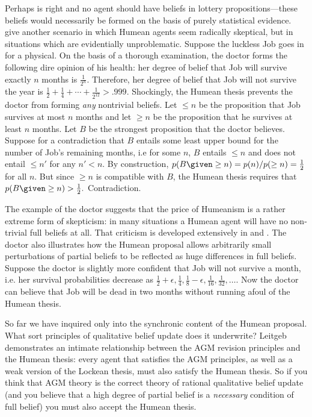 Perhaps \citet{buchak2014belief} is right and no agent should have beliefs in
lottery propositions---these beliefs would necessarily be formed on the basis of
purely statistical evidence. \citet{lin2019correspondence} give another scenario
in which Humean agents seem radically skeptical, but in situations which are
evidentially unproblematic. Suppose the luckless Job goes in for a physical. On
the basis of a thorough examination, the doctor forms the following dire opinion
of his health: her degree of belief that Job will survive exactly $n$ months is
$\frac{1}{2^n}.$ Therefore, her degree of belief that Job will not survive the
year is $\frac{1}{2} + \frac{1}{4} + \cdots + \frac{1}{2^{12}} > .999.$
Shockingly, the Humean thesis prevents the doctor from forming {\em any}
nontrivial beliefs. Let $\leq n$ be the proposition that Job survives at most
$n$ months and let $\geq n$ be the proposition that he survives at least $n$
months. Let $B$ be the strongest proposition that the doctor believes. Suppose
for a contradiction that $B$ entails some least upper bound for the number of
Job's remaining months, i.e for some $n$, $B$ entails $\leq n$ and does not
entail $\leq n'$ for any $n'<n$.  By construction, $p(B \given \geq n) =
p(n)/p(\geq n) = \frac{1}{2}$ for all $n$. But since $\geq n$ is compatible with
$B$, the Humean thesis requires that $p(B \given  \geq n) > \frac{1}{2}.$
Contradiction. 

The example of the doctor suggests that the price of Humeanism is a rather
extreme form of skepticism: in many situations a Humean agent will have no
non-trivial full beliefs at all. That criticism is developed extensively in
\citet{rott2017stability} and \citet{douven2018probabilities}. The doctor also
illustrates how the Humean proposal allows arbitrarily small perturbations of
partial beliefs to be reflected as huge differences in full beliefs. Suppose the
doctor is slightly more confident that Job will not survive a month, i.e. her
survival probabilities decrease as $\frac{1}{2} + \epsilon, \frac{1}{4},
\frac{1}{8} - \epsilon, \frac{1}{16}, \frac{1}{32}, \ldots.$ Now the doctor can
believe that Job will be dead in two months without running afoul of the Humean
thesis.

So far we have inquired  only into the synchronic content of the Humean
proposal. What sort principles of qualitative belief update does it underwrite?
Leitgeb demonstrates an intimate relationship between the AGM revision principles
and the Humean thesis: every agent that satisfies the AGM principles, as well as
a weak version of the Lockean thesis, must also satisfy the Humean thesis. So if
you think that AGM theory is the correct theory of rational qualitative belief
update (and you believe that a high degree of partial belief is a {\em
necessary} condition of full belief) you must also accept the Humean thesis.


